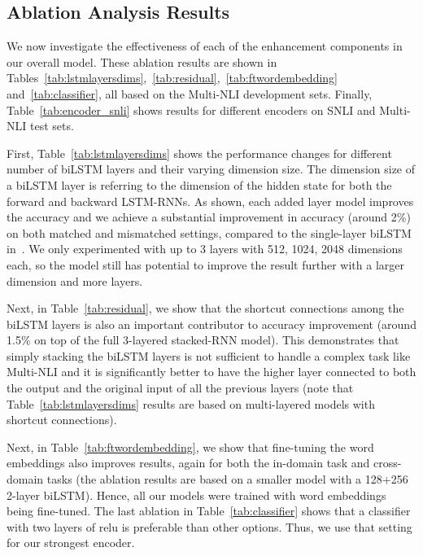 \documentclass[11pt,letterpaper]{article}
\begin{document}
\subsection{Ablation Analysis Results}
We now investigate the effectiveness of each of the enhancement components in our overall model. These ablation results are shown in Tables~\ref{tab:lstmlayersdims},~\ref{tab:residual},~\ref{tab:ftwordembedding} and~\ref{tab:classifier}, all based on the Multi-NLI development sets. Finally, Table~\ref{tab:encoder_snli} shows results for different encoders on SNLI and Multi-NLI test sets.



First, Table~\ref{tab:lstmlayersdims} shows the performance changes for different number of biLSTM layers and their varying dimension size. The dimension size of a biLSTM layer is referring to the dimension of the hidden state for both the forward and backward LSTM-RNNs. As shown, each added layer model improves the accuracy and we achieve a substantial improvement in accuracy (around 2\%) on both matched and mismatched settings, compared to the single-layer biLSTM in~. We only experimented with up to 3 layers with 512, 1024, 2048 dimensions each, so the model still has potential to improve the result further with a larger dimension and more layers.




Next, in Table~\ref{tab:residual}, we show that the shortcut connections among the biLSTM layers is also an important contributor to accuracy improvement (around 1.5\% on top of the full 3-layered stacked-RNN model). This demonstrates that simply stacking the biLSTM layers is not sufficient to handle a complex task like Multi-NLI and it is significantly better to have the higher layer connected to both the output and the original input of all the previous layers (note that Table~\ref{tab:lstmlayersdims} results are based on multi-layered models with shortcut connections).

Next, in Table~\ref{tab:ftwordembedding}, we show that fine-tuning the word embeddings also improves results, again for both the in-domain task and cross-domain tasks (the ablation results are based on a smaller model with a 128+256 2-layer biLSTM). Hence, all our models were trained with word embeddings being fine-tuned. 
The last ablation in Table~\ref{tab:classifier} shows that a classifier with two layers of relu is preferable than other options. Thus, we use that setting for our strongest encoder.
\end{document}
